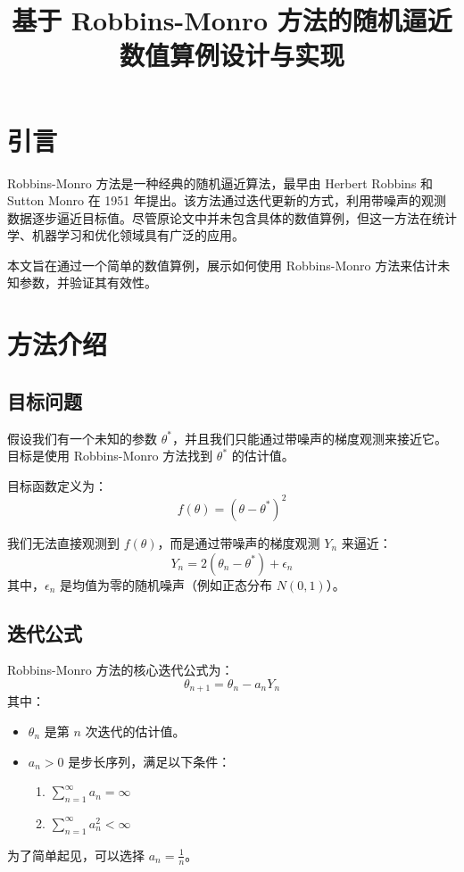 \documentclass{article}
\title{基于 Robbins-Monro 方法的随机逼近数值算例设计与实现}
\author{}
\date{}
\begin{document}
\maketitle

\section{引言}
Robbins-Monro 方法是一种经典的随机逼近算法，最早由 Herbert Robbins 和 Sutton Monro 在 1951 年提出。该方法通过迭代更新的方式，利用带噪声的观测数据逐步逼近目标值。尽管原论文中并未包含具体的数值算例，但这一方法在统计学、机器学习和优化领域具有广泛的应用。

本文旨在通过一个简单的数值算例，展示如何使用 Robbins-Monro 方法来估计未知参数，并验证其有效性。

\section{方法介绍}
\subsection{目标问题}
假设我们有一个未知的参数 $\theta^*$，并且我们只能通过带噪声的梯度观测来接近它。目标是使用 Robbins-Monro 方法找到 $\theta^*$ 的估计值。

目标函数定义为：
$$
f(\theta) = (\theta - \theta^*)^2
$$

我们无法直接观测到 $f(\theta)$，而是通过带噪声的梯度观测 $Y_n$ 来逼近：
$$
Y_n = 2(\theta_n - \theta^*) + \epsilon_n
$$
其中，$\epsilon_n$ 是均值为零的随机噪声（例如正态分布 $N(0, 1)$）。

\subsection{迭代公式}
Robbins-Monro 方法的核心迭代公式为：
$$
\theta_{n+1} = \theta_n - a_n Y_n
$$
其中：
\begin{itemize}
    \item $\theta_n$ 是第 $n$ 次迭代的估计值。
    \item $a_n > 0$ 是步长序列，满足以下条件：
          \begin{enumerate}
              \item $\sum_{n=1}^\infty a_n = \infty$
              \item $\sum_{n=1}^\infty a_n^2 < \infty$
          \end{enumerate}
\end{itemize}

为了简单起见，可以选择 $a_n = \frac{1}{n}$。
\end{document}
